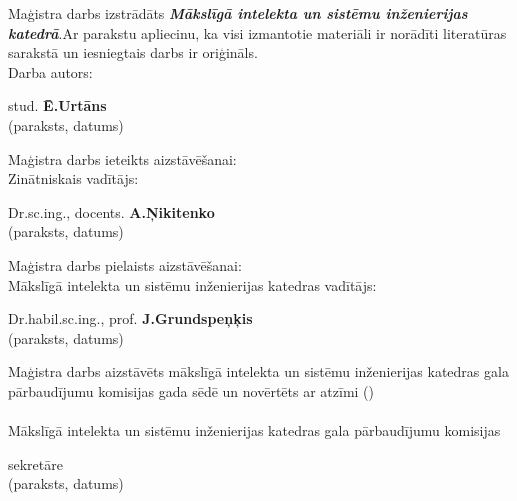 \documentclass[12pt, a4paper, oneside, openright]{article}
\begin{document}
\normalsize{
	Maģistra darbs izstrādāts \textbf{\textit{Mākslīgā intelekta un sistēmu inženierijas katedrā}}.Ar parakstu apliecinu, ka visi izmantotie materiāli ir norādīti literatūras sarakstā un iesniegtais darbs ir oriģināls. 
\vspace{\baselineskip}\\
	Darba autors:
\begin{flushright}
 stud. \textbf{Ē.Urtāns} 
 \makebox[10cm]{\dotfill}\\  
 \fontsize{10}{10}\selectfont
 (paraksts, datums)\ \ \ \ \ \ \ \ \ \ \ \ \ \ \ \
\end{flushright}
\vspace{\baselineskip}
Maģistra darbs ieteikts aizstāvēšanai:
\vspace{\baselineskip}\\
	Zinātniskais vadītājs:
\begin{flushright}
 Dr.sc.ing., docents. \textbf{A.Ņikitenko} 
 \makebox[8cm]{\dotfill}\\  
 \fontsize{10}{10}\selectfont
 (paraksts, datums)\ \ \ \ \ \ \ \ \ \ \ \ \ \ \ \
\end{flushright}
\vspace{\baselineskip}
Maģistra darbs pielaists aizstāvēšanai:
\vspace{\baselineskip}\\
	Mākslīgā intelekta un sistēmu inženierijas katedras vadītājs:
\begin{flushright}
 Dr.habil.sc.ing., prof. \textbf{J.Grundspeņķis} 
 \makebox[8cm]{\dotfill}\\  
 \fontsize{10}{10}\selectfont
 (paraksts, datums)\ \ \ \ \ \ \ \ \ \ \ \ \ \ \ \
\end{flushright}
\vspace{\baselineskip}
\vspace{\baselineskip}
{Maģistra darbs aizstāvēts mākslīgā intelekta un sistēmu inženierijas katedras gala pārbaudījumu
komisijas \makebox[1.5cm]{\dotfill} gada \makebox[2.5cm]{\dotfill} sēdē un novērtēts ar atzīmi (\makebox[1cm]{\dotfill}) \makebox[3cm]{\dotfill}\\}
\vspace{0cm}
\hspace{2cm}{
\fontsize{10}{10}\selectfont
(gads)\hspace{1cm}(datums, mēnesis)
}
\vspace{\baselineskip}
\vspace{\baselineskip}\\
Mākslīgā intelekta un sistēmu inženierijas katedras gala pārbaudījumu komisijas
\begin{flushright}
 sekretāre 
 \makebox[8cm]{\dotfill}\\  
 \fontsize{10}{10}\selectfont
 (paraksts, datums)\ \ \ \ \ \ \ \ \ \ \ \ \ \ \ \
\end{flushright}
}	
	
\end{document}
